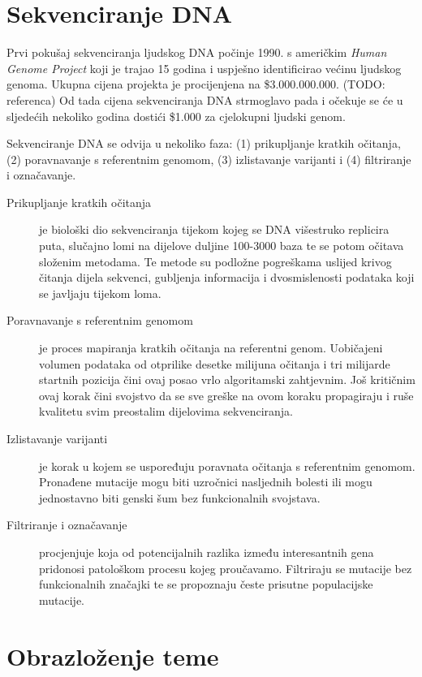 \documentclass[times, utf8, diplomski]{fer}
\begin{document}
\section{Sekvenciranje DNA}

Prvi pokušaj sekvenciranja ljudskog DNA počinje 1990. s američkim \emph{Human Genome Project} koji je trajao 15
godina i uspješno identificirao većinu ljudskog genoma. Ukupna cijena projekta je procijenjena na \$3.000.000.000.
(TODO: referenca)
Od tada cijena sekvenciranja DNA strmoglavo pada i očekuje se će u sljedećih nekoliko godina dostići \$1.000 za
cjelokupni ljudski genom.

Sekvenciranje DNA se odvija u nekoliko faza: (1) prikupljanje kratkih očitanja, (2) poravnavanje s referentnim genomom, (3) izlistavanje varijanti i (4) filtriranje i označavanje.

\begin{description}
\item[Prikupljanje kratkih očitanja] je biološki dio sekvenciranja tijekom kojeg se DNA višestruko replicira puta, slučajno lomi na dijelove duljine 100-3000 baza te se potom očitava složenim metodama. Te metode su podložne pogreškama uslijed krivog čitanja dijela sekvenci, gubljenja informacija i dvosmislenosti podataka koji se javljaju tijekom loma.

\item[Poravnavanje s referentnim genomom] je proces mapiranja kratkih očitanja na referentni genom. Uobičajeni volumen podataka od otprilike desetke milijuna očitanja i tri milijarde startnih pozicija čini ovaj posao vrlo
algoritamski zahtjevnim. Još kritičnim ovaj korak čini svojstvo da se sve greške na ovom koraku propagiraju i
ruše kvalitetu svim preostalim dijelovima sekvenciranja.

\item [Izlistavanje varijanti] je korak u kojem se uspoređuju poravnata očitanja s referentnim genomom. Pronađene
mutacije mogu biti uzročnici nasljednih bolesti ili mogu jednostavno biti genski šum bez funkcionalnih svojstava.

\item [Filtriranje i označavanje] procjenjuje koja od potencijalnih razlika između interesantnih gena pridonosi 
patološkom procesu kojeg proučavamo. Filtriraju se mutacije bez funkcionalnih značajki te se propoznaju česte prisutne populacijske mutacije.
\end{description}

\section{Obrazloženje teme}
\end{document}
